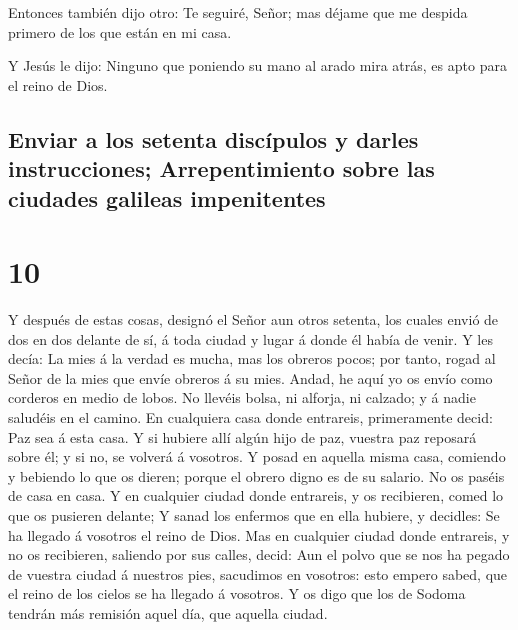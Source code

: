  Entonces también dijo otro: Te seguiré, Señor; mas
déjame que me despida primero de los que están en mi casa.

 Y Jesús le dijo: Ninguno que poniendo su mano al arado
mira atrás, es apto para el reino de Dios.

\hypertarget{enviar-a-los-setenta-discuxedpulos-y-darles-instrucciones-arrepentimiento-sobre-las-ciudades-galileas-impenitentes}{%
\subsection{Enviar a los setenta discípulos y darles instrucciones;
Arrepentimiento sobre las ciudades galileas
impenitentes}\label{enviar-a-los-setenta-discuxedpulos-y-darles-instrucciones-arrepentimiento-sobre-las-ciudades-galileas-impenitentes}}

\hypertarget{section-9}{%
\section{10}\label{section-9}}

 Y después de estas cosas, designó el Señor aun otros
setenta, los cuales envió de dos en dos delante de sí, á toda ciudad y
lugar á donde él había de venir.  Y les decía: La mies á
la verdad es mucha, mas los obreros pocos; por tanto, rogad al Señor de
la mies que envíe obreros á su mies.  Andad, he aquí yo os
envío como corderos en medio de lobos.  No llevéis bolsa,
ni alforja, ni calzado; y á nadie saludéis en el camino. 
En cualquiera casa donde entrareis, primeramente decid: Paz sea á esta
casa.  Y si hubiere allí algún hijo de paz, vuestra paz
reposará sobre él; y si no, se volverá á vosotros.  Y
posad en aquella misma casa, comiendo y bebiendo lo que os dieren;
porque el obrero digno es de su salario. No os paséis de casa en casa.
 Y en cualquier ciudad donde entrareis, y os recibieren,
comed lo que os pusieren delante;  Y sanad los enfermos
que en ella hubiere, y decidles: Se ha llegado á vosotros el reino de
Dios.  Mas en cualquier ciudad donde entrareis, y no os
recibieren, saliendo por sus calles, decid:  Aun el polvo
que se nos ha pegado de vuestra ciudad á nuestros pies, sacudimos en
vosotros: esto empero sabed, que el reino de los cielos se ha llegado á
vosotros.  Y os digo que los de Sodoma tendrán más
remisión aquel día, que aquella ciudad.


